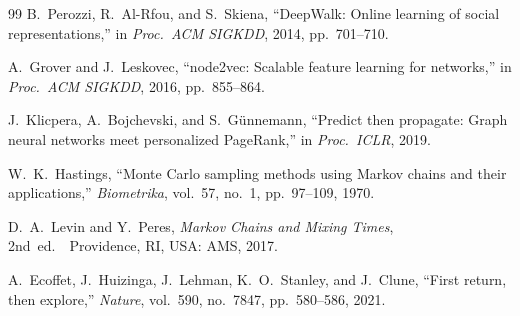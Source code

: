 \documentclass[conference,a4paper,10pt]{IEEEtran}
\begin{document}
\begin{thebibliography}{99}
B.~Perozzi, R.~Al-Rfou, and S.~Skiena, ``DeepWalk: Online learning of
social representations,'' in \emph{Proc.\ ACM SIGKDD}, 2014, pp.~701--710.

A.~Grover and J.~Leskovec, ``node2vec: Scalable feature learning for
networks,'' in \emph{Proc.\ ACM SIGKDD}, 2016, pp.~855--864.

J.~Klicpera, A.~Bojchevski, and S.~G\"{u}nnemann, ``Predict then propagate:
Graph neural networks meet personalized PageRank,'' in \emph{Proc.\ ICLR},
2019.

W.~K.~Hastings, ``Monte Carlo sampling methods using Markov chains and
their applications,'' \emph{Biometrika}, vol.~57, no.~1, pp.~97--109, 1970.

D.~A.~Levin and Y.~Peres, \emph{Markov Chains and Mixing Times}, 2nd~ed.\ \
Providence, RI, USA: AMS, 2017.

A.~Ecoffet, J.~Huizinga, J.~Lehman, K.~O.~Stanley, and J.~Clune,
``First return, then explore,'' \emph{Nature}, vol.~590, no.~7847,
pp.~580--586, 2021.

\end{thebibliography}
\end{document}
